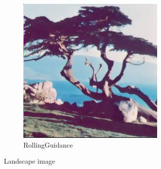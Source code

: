 \documentclass[12pt]{article}
\begin{document}
\begin{figure}
		\begin{subfigure}{0.4\textwidth}
			\centering
			\includegraphics[width=0.8\textwidth]{tree/treetiffRollingGuidanceFilter.png}
			\caption{RollingGuidance}
		\end{subfigure}
		\caption{Landscape image}
	\end{figure}
\end{document}
